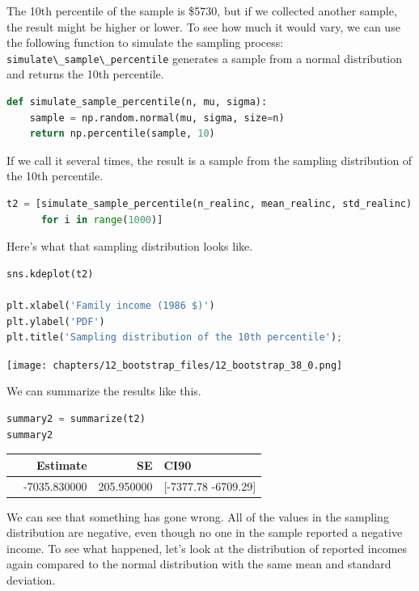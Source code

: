 The 10th percentile of the sample is \$5730, but if we collected another
sample, the result might be higher or lower. To see how much it would
vary, we can use the following function to simulate the sampling
process: \passthrough{\lstinline!simulate\_sample\_percentile!}
generates a sample from a normal distribution and returns the 10th
percentile.

\begin{lstlisting}[language=Python,style=source]
def simulate_sample_percentile(n, mu, sigma):
    sample = np.random.normal(mu, sigma, size=n)
    return np.percentile(sample, 10)
\end{lstlisting}

If we call it several times, the result is a sample from the sampling
distribution of the 10th percentile.

\begin{lstlisting}[language=Python,style=source]
t2 = [simulate_sample_percentile(n_realinc, mean_realinc, std_realinc)
      for i in range(1000)]
\end{lstlisting}

Here's what that sampling distribution looks like.

\begin{lstlisting}[language=Python,style=source]
sns.kdeplot(t2)

plt.xlabel('Family income (1986 $)')
plt.ylabel('PDF')
plt.title('Sampling distribution of the 10th percentile');
\end{lstlisting}

\begin{center}
\texttt{[image: chapters/12\_bootstrap\_files/12\_bootstrap\_38\_0.png]}
\end{center}

We can summarize the results like this.

\begin{lstlisting}[language=Python,style=source]
summary2 = summarize(t2)
summary2
\end{lstlisting}

\begin{tabular}{lrrl}
\midrule
 & Estimate & SE & CI90 \\
\midrule
 & -7035.830000 & 205.950000 & [-7377.78 -6709.29] \\
\midrule
\end{tabular}

We can see that something has gone wrong. All of the values in the
sampling distribution are negative, even though no one in the sample
reported a negative income. To see what happened, let's look at the
distribution of reported incomes again compared to the normal
distribution with the same mean and standard deviation.

